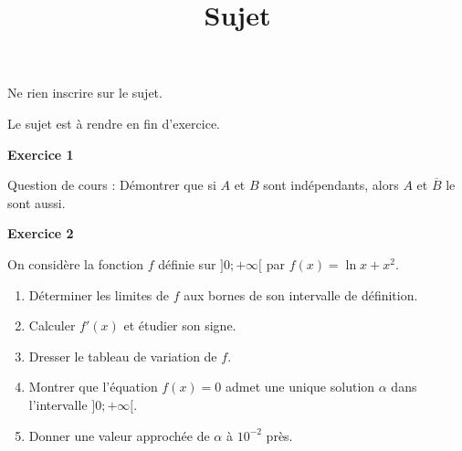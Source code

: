 \documentclass[12pt,a4paper,french]{article}
\author{}
\title{Sujet \no{15}}
\date{}
\begin{document}
\maketitle
\begin{center}Ne rien inscrire sur le sujet.

  Le sujet est à rendre en fin d'exercice.
\end{center}

\bigskip

\textbf{Exercice 1}

Question de cours : Démontrer que si $A$ et $B$ sont indépendants, alors
$A$ et $\overline{B}$ le sont aussi.

\medskip

\textbf{Exercice 2}

On considère la fonction $f$ définie sur $]0;+\infty[$ par $f(x) = \ln x
+ x^2$.

\begin{enumerate}
  \item Déterminer les limites de $f$ aux bornes de son intervalle de
    définition.
  \item Calculer $f'(x)$ et étudier son signe.
  \item Dresser le tableau de variation de $f$.
  \item Montrer que l'équation $f(x) = 0$ admet une unique solution
    $\alpha$ dans l'intervalle $]0;+\infty[$.
  \item Donner une valeur approchée de $\alpha$ à $10^{-2}$ près.
\end{enumerate}
\end{document}
